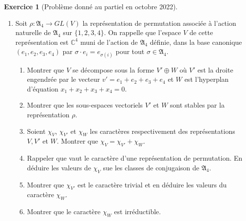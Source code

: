 \documentclass[french]{book}
\theoremstyle{definition}
\newtheorem{exo}{Exercice}
\begin{document}
\begin{exo}[Problème donné au partiel en octobre 2022]
\begin{enumerate}
    \item Soit \(\rho : \mathfrak{A}_{4} \longrightarrow GL(V)\) la représentation de permutation associée à l'action naturelle de \(\mathfrak{A}_{4}\) sur \(\{ 1, 2, 3, 4\}\). On rappelle que l'espace \(V\) de cette représentation est \(\mathbb{C}^{4}\) muni de l'action de \(\mathfrak{A}_{4}\) définie, dans la base canonique \((e_1, e_2, e_3, e_4)\) par \(\sigma \cdot e_i = e _{\sigma(i)}\) pour tout \(\sigma \in \mathfrak{A}_{4}\).
    \begin{enumerate}
      \item Montrer que \(V\) se décompose sous la forme \(V' \oplus W\) où \(V'\) est la droite engendrée par le vecteur \(v' = e_1 + e_2 + e_3 + e_4\) et \(W\) est l'hyperplan d'équation \(x_1 + x_2 + x_3 + x_4 = 0\).
      \item Montrer que les sous-espaces vectoriels \(V'\) et \(W\) sont stables par la représentation \(\rho\).
      \item Soient \(\chi_V\), \(\chi _{V'}\) et \(\chi_W\) les caractères respectivement des représentations \(V, V'\) et \(W\).
      Montrer que \(\chi_V = \chi _{V'}+ \chi _{W}\).
      \item Rappeler que vaut le caractère d'une représentation de permutation. En déduire les valeurs de \(\chi_V\) sue les classes de conjugaison de \(\mathfrak{A}_{4}\).
      \item Montrer que \(\chi _{V'}\) est le caractère trivial et en déduire les valeurs du caractère \(\chi_W\).
      \item Montrer que le caractère \(\chi_W\) est irréductible.
    \end{enumerate}
  \end{enumerate}
\end{exo}

\end{document}
